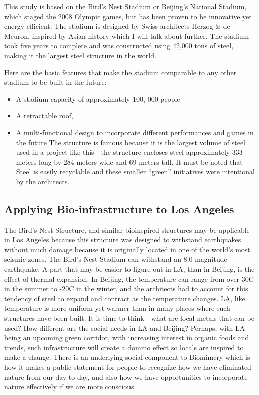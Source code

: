 This study is based on the Bird's Nest Stadium or Beijing's National Stadium, which staged the 2008 Olympic games, but has been proven to be innovative yet energy efficient.  The stadium is designed by Swiss architects Herzog \& de Meuron, inspired by Asian history which I will talk about further. The stadium took five years to complete and was constructed using 42,000 tons of steel, making it the largest steel structure in the world. 

Here are the basic features that make the stadium comparable to any other stadium to be built in the future:

\begin{itemize}
  \item A stadium capacity of approximately 100, 000 people 
  \item A retractable roof, 
  \item A multi-functional design to incorporate different performances and games in the future 
The structure is famous because it is the largest volume of steel used in a project like this - the structure encloses steel approximately 333 meters long by 284 meters wide and 69 meters tall. It must be noted that Steel is easily recyclable and these smaller ``green'' initiatives were intentional by the architects.
\end{itemize}


\subsection{Applying Bio-infrastructure to Los Angeles}

The Bird's Nest Structure, and similar bioinspired structures may be applicable in Los Angeles because this structure was designed to withstand earthquakes without much damage because it is originally located in one of the world's most seismic zones. The Bird's Nest Stadium can withstand an 8.0 magnitude earthquake. A part that may be easier to figure out in LA, than in Beijing, is the effect of thermal expansion. In Beijing, the temperature can range from over 30\degree C in the summer to -20\degree C in the winter, and the architects had to account for this tendency of steel to expand and contract as the temperature changes. LA, like temperature is more uniform yet warmer than in many places where such structures have been built. It is time to think - what are local metals that can be used? How different are the social needs in LA and Beijing? Perhaps, with LA being an upcoming green corridor, with increasing interest in organic foods and trends, such infrastructure will create a domino effect so locals are inspired to make a change. There is an underlying social component to Biomimcry which is how it makes a public statement for people to recognize how we have eliminated nature from our day-to-day, and also how we have opportunities to incorporate nature effectively if we are more conscious.

